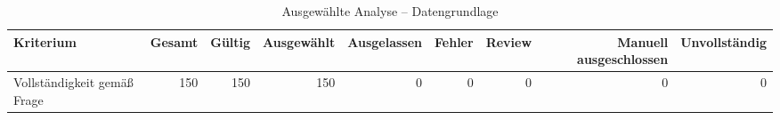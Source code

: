 \begin{table}[htbp]
\centering
\caption{Ausgewählte Analyse -- Datengrundlage}
\begin{tabular}{lrrrrrrrr}
\toprule
Kriterium & Gesamt & Gültig & Ausgewählt & Ausgelassen & Fehler & Review & Manuell ausgeschlossen & Unvollständig \\
\midrule
Vollständigkeit gemäß Frage & 150 & 150 & 150 & 0 & 0 & 0 & 0 & 0 \\
\bottomrule
\end{tabular}
\end{table}
